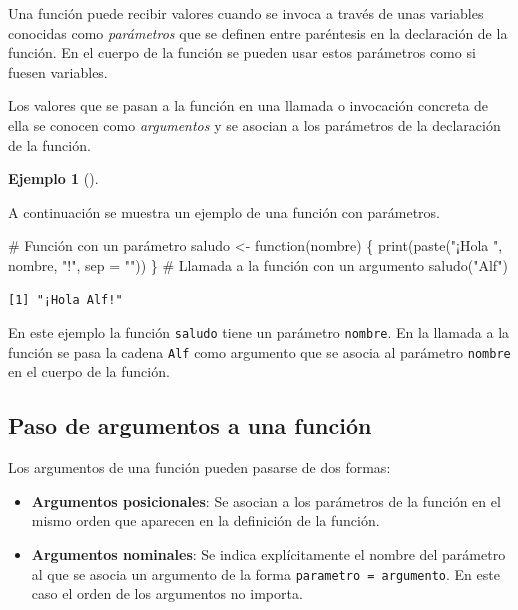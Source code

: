 \documentclass[
  a4paper,
]{scrreport}
\newenvironment{Shaded}{\begin{snugshade}}{\end{snugshade}}
\newcommand{\AttributeTok}[1]{\textcolor[rgb]{0.40,0.45,0.13}{#1}}
\newcommand{\CommentTok}[1]{\textcolor[rgb]{0.37,0.37,0.37}{#1}}
\newcommand{\ControlFlowTok}[1]{\textcolor[rgb]{0.00,0.23,0.31}{#1}}
\newcommand{\FunctionTok}[1]{\textcolor[rgb]{0.28,0.35,0.67}{#1}}
\newcommand{\NormalTok}[1]{\textcolor[rgb]{0.00,0.23,0.31}{#1}}
\newcommand{\OtherTok}[1]{\textcolor[rgb]{0.00,0.23,0.31}{#1}}
\newcommand{\StringTok}[1]{\textcolor[rgb]{0.13,0.47,0.30}{#1}}
\providecommand{\tightlist}{%
  \setlength{\itemsep}{0pt}\setlength{\parskip}{0pt}}\usepackage{longtable,booktabs,array}
\theoremstyle{definition}
\theoremstyle{definition}
\newtheorem{example}{Ejemplo}[chapter]
\theoremstyle{remark}
\begin{document}
Una función puede recibir valores cuando se invoca a través de unas
variables conocidas como \emph{parámetros} que se definen entre
paréntesis en la declaración de la función. En el cuerpo de la función
se pueden usar estos parámetros como si fuesen variables.

Los valores que se pasan a la función en una llamada o invocación
concreta de ella se conocen como \emph{argumentos} y se asocian a los
parámetros de la declaración de la función.

\leavevmode{}%
\begin{example}[]\label{exm-funcion-con-parametros}

A continuación se muestra un ejemplo de una función con parámetros.

\begin{Shaded}
\begin{Highlighting}[]
\CommentTok{\# Función con un parámetro}
\NormalTok{saludo }\OtherTok{\textless{}{-}} \ControlFlowTok{function}\NormalTok{(nombre) \{}
  \FunctionTok{print}\NormalTok{(}\FunctionTok{paste}\NormalTok{(}\StringTok{"¡Hola "}\NormalTok{, nombre, }\StringTok{"!"}\NormalTok{, }\AttributeTok{sep =} \StringTok{""}\NormalTok{))}
\NormalTok{\}}
\CommentTok{\# Llamada a la función con un argumento}
\FunctionTok{saludo}\NormalTok{(}\StringTok{"Alf"}\NormalTok{)}
\end{Highlighting}
\end{Shaded}

\begin{verbatim}
[1] "¡Hola Alf!"
\end{verbatim}

En este ejemplo la función \texttt{saludo} tiene un parámetro
\texttt{nombre}. En la llamada a la función se pasa la cadena
\texttt{Alf} como argumento que se asocia al parámetro \texttt{nombre}
en el cuerpo de la función.

\end{example}

\hypertarget{paso-de-argumentos-a-una-funciuxf3n}{%
\subsection{Paso de argumentos a una
función}\label{paso-de-argumentos-a-una-funciuxf3n}}

Los argumentos de una función pueden pasarse de dos formas:

\begin{itemize}
\tightlist
\item
  \textbf{Argumentos posicionales}: Se asocian a los parámetros de la
  función en el mismo orden que aparecen en la definición de la función.
\item
  \textbf{Argumentos nominales}: Se indica explícitamente el nombre del
  parámetro al que se asocia un argumento de la forma
  \texttt{parametro\ =\ argumento}. En este caso el orden de los
  argumentos no importa.
\end{itemize}
\end{document}
